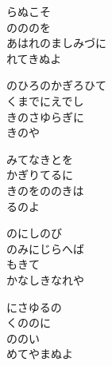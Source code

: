 \documentclass[10pt,b5j]{tarticle} %
\begin{document}
\vspace{1.5em} %
\newcommand{\linespace}{0.5em} %
\newcommand{\blocksize}{0.5\hsize} %
\begin{enumerate} %
    \begin{minipage}[c]{\blocksize}
    
        \vspace{\linespace}
        \item
        らぬこそ\\
        のののを\\
        あはれのましみづに\\
        れてきぬよ
        
        \vspace{\linespace}
        \item
        のひろのかぎろひて\\
        くまでにえでし\\
        きのさゆらぎに\\
        きのや
        
        \vspace{\linespace}
        \item
        みてなきとを\\
        かぎりてるに\\
        きのをののきは\\
        るのよ
        
        \vspace{\linespace}
        \item
        のにしのび\\
        のみにじらへば\\
        もきて\\
        かなしきなれや
        
        \vspace{\linespace}
        \item
        にさゆるの\\
        くののに\\
        ののい\\
        めてやまぬよ
        

\end{minipage}
\end{enumerate}
\end{document}
